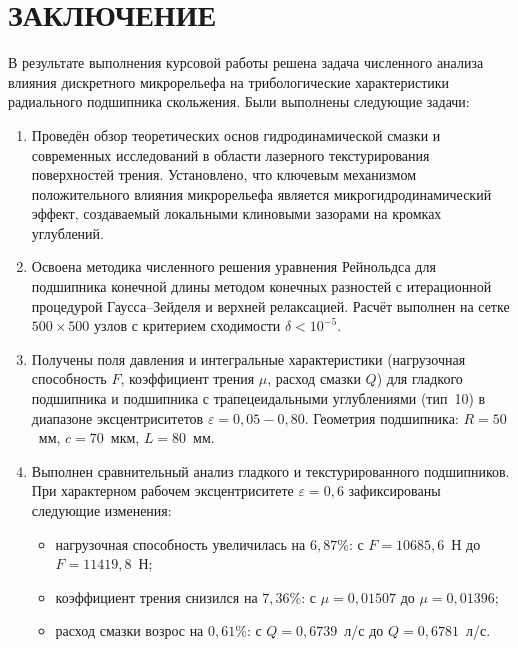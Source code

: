 \section*{ЗАКЛЮЧЕНИЕ}
{}

В результате выполнения курсовой работы решена задача численного анализа влияния дискретного микрорельефа на трибологические характеристики радиального подшипника скольжения. Были выполнены следующие задачи:

\begin{enumerate}
    \item Проведён обзор теоретических основ гидродинамической смазки и современных исследований в области лазерного текстурирования поверхностей трения. Установлено, что ключевым механизмом положительного влияния микрорельефа является микрогидродинамический эффект, создаваемый локальными клиновыми зазорами на кромках углублений.

    \item Освоена методика численного решения уравнения Рейнольдса для подшипника конечной длины методом конечных разностей с итерационной процедурой Гаусса--Зейделя и верхней релаксацией. Расчёт выполнен на сетке $500 \times 500$ узлов с критерием сходимости $\delta < 10^{-5}$.

    \item Получены поля давления и интегральные характеристики (нагрузочная способность $F$, коэффициент трения $\mu$, расход смазки $Q$) для гладкого подшипника и подшипника с трапецеидальными углублениями (тип~10) в диапазоне эксцентриситетов $\varepsilon = 0{,}05 - 0{,}80$. Геометрия подшипника: $R = 50$~мм, $c = 70$~мкм, $L = 80$~мм.

    \item Выполнен сравнительный анализ гладкого и текстурированного подшипников. При характерном рабочем эксцентриситете $\varepsilon = 0{,}6$ зафиксированы следующие изменения:
    \begin{itemize}
        \item нагрузочная способность увеличилась на $6{,}87$\%: с $F = 10685{,}6$~Н до $F = 11419{,}8$~Н;
        \item коэффициент трения снизился на $7{,}36$\%: с $\mu = 0{,}01507$ до $\mu = 0{,}01396$;
        \item расход смазки возрос на $0{,}61$\%: с $Q = 0{,}6739$~л/с до $Q = 0{,}6781$~л/с.
    \end{itemize}
\end{enumerate}

